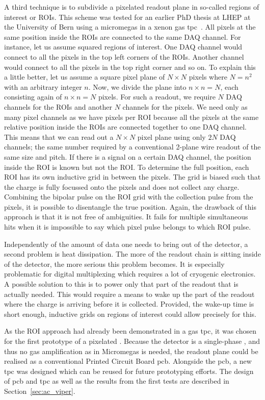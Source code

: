 A third technique is to subdivide a pixelated readout plane in so-called regions of interest or ROIs.
This scheme was tested for an earlier PhD thesis at LHEP at the University of Bern using a \gls{micromegas} in a xenon gas \gls{tpc}~\cite{maplesyrup}.
All pixels at the same position inside the ROIs are connected to the same DAQ channel.
For instance, let us assume squared regions of interest.
One DAQ channel would connect to all the pixels in the top left corners of the ROIs.
Another channel would connect to all the pixels in the top right corner and so on.
To explain this a little better, let us assume a square pixel plane of $N \times N$ pixels where $N = n ^ 2$ with an arbitrary integer $n$.
Now, we divide the plane into $n \times n = N$, each consisting again of $n \times n = N$ pixels.
For such a readout, we require $N$ DAQ channels for the ROIs and another $N$ channels for the pixels.
We need only as many pixel channels as we have pixels per ROI because all the pixels at the same relative position inside the ROIs are connected together to one DAQ channel.
This means that we can read out a $N \times N$ pixel plane using only $2 N$ DAQ channels; the same number required by a conventional 2-plane wire readout of the same size and pitch.
If there is a signal on a certain DAQ channel, the position inside the ROI is known but not the ROI.
To determine the full position, each ROI has its own inductive grid in between the pixels.
The grid is biased such that the charge is fully focussed onto the pixels and does not collect any charge.
Combining the bipolar pulse on the ROI grid with the collection pulse from the pixels, it is possible to disentangle the true position.
Again, the drawback of this approach is that it is not free of ambiguities.
It fails for multiple simultaneous hits when it is impossible to say which pixel pulse belongs to which ROI pulse.

Independently of the amount of data one needs to bring out of the detector, a second problem is heat dissipation.
The more of the readout chain is sitting inside of the detector, the more serious this problem becomes.
It is especially problematic for digital multiplexing which requires a lot of cryogenic electronics.
A possible solution to this is to power only that part of the readout that is actually needed.
This would require a means to wake up the part of the readout where the charge is arriving before it is collected.
Provided, the wake-up time is short enough, inductive grids on regions of interest could allow precisely for this.

As the ROI approach had already been demonstrated in a gas \gls{tpc}, it was chosen for the first prototype of a pixelated \lartpc{}.
Because the detector is a single-phase \lartpc{}, and thus no gas amplification as in Micromegas is needed, the readout plane could be realised as a conventional Printed Circuit Board \gls{pcb}.
Alongside the \gls{pcb}, a new \gls{tpc} was designed which can be reused for future prototyping efforts.
The design of \gls{pcb} and \gls{tpc} as well as the results from the first tests are described in Section~\ref{sec:ac_viper}.